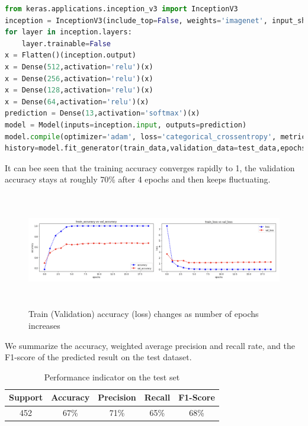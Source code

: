 \begin{lstlisting}[language=python]
from keras.applications.inception_v3 import InceptionV3
inception = InceptionV3(include_top=False, weights='imagenet', input_shape=(264,264,3))
for layer in inception.layers:
    layer.trainable=False
x = Flatten()(inception.output)
x = Dense(512,activation='relu')(x)
x = Dense(256,activation='relu')(x)
x = Dense(128,activation='relu')(x)
x = Dense(64,activation='relu')(x)
prediction = Dense(13,activation='softmax')(x)
model = Model(inputs=inception.input, outputs=prediction)
model.compile(optimizer='adam', loss='categorical_crossentropy', metrics=['accuracy'],weighted_metrics=[tf.keras.metrics.Precision(), tf.keras.metrics.Recall()])
history=model.fit_generator(train_data,validation_data=test_data,epochs=20,steps_per_epoch=len(train_data),validation_steps=len(test_data))
\end{lstlisting}
\vspace{-0.6cm}

It can bee seen that the training accuracy converges rapidly to 1, the validation accuracy stays at roughly 70\% after 4 epochs and then keeps fluctuating.

\begin{figure}[H]
    \centering\includegraphics[width=16cm, height=5cm]{./figures/inc-acc.jpg}
    \caption{Train (Validation) accuracy (loss) changes as number of epochs increases}
    \label{pic:vgg16}
\end{figure}

We summarize the accuracy, weighted average precision and recall rate, and the F1-score of the predicted result on the test dataset.

\begin{table}[!htbp]
    \small
	\centering
	\begin{tabularx}{0.6\textwidth}{ccccc}
		\toprule
		\textbf{Support}
       &  \textbf{Accuracy}
        & \textbf{Precision} 
        & \textbf{Recall} 
        & \textbf{F1-Score} \\

        \midrule
        452
        & 67\%
        & 71\%
        & 65\%
        & 68\%\\
		\bottomrule
	\end{tabularx}%
	\label{tab:result4}%
	\caption{Performance indicator on the test set}
\end{table}%

